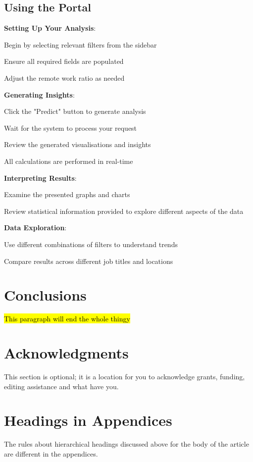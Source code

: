 \documentclass[11pt,a4paper]{article}
\newcommand{\hint}[1]{%
  \begingroup
  \sethlcolor{yellow!30}%
  \hl{#1}%
  \endgroup
}
\newcommand{\SubItem}[1]{
  {\setlength\itemindent{13pt} \item[◦] #1}
}
\begin{document}
\subsection{Using the Portal}
\begin{itemize}
\item \textbf{Setting Up Your Analysis}: 
\SubItem{Begin by selecting relevant filters from the sidebar}
\SubItem{Ensure all required fields are populated}
\SubItem{Adjust the remote work ratio as needed}
\item \textbf{Generating Insights}: 
\SubItem{Click the "Predict" button to generate analysis}
\SubItem{Wait for the system to process your request}
\SubItem{Review the generated visualisations and insights}
\SubItem{All calculations are performed in real-time}
\item \textbf{Interpreting Results}: 
\SubItem{Examine the presented graphs and charts}
\SubItem{Review statistical information provided to explore different aspects of the data}
\item \textbf{Data Exploration}: 
\SubItem{Use different combinations of filters to understand trends}
\SubItem{Compare results across different job titles and locations}
\end{itemize}






\section{Conclusions}
\hint{This paragraph will end the whole thingy}


\clearpage

\appendix
\section{Acknowledgments}
This section is optional; it is a location for you
to acknowledge grants, funding, editing assistance and
what have you.  

\section{Headings in Appendices}
The rules about hierarchical headings discussed above for
the body of the article are different in the appendices.

\printglossary[type=\acronymtype]

\listoffigures  %
\listoftables   %
\listoflistings %


    
\end{document}
